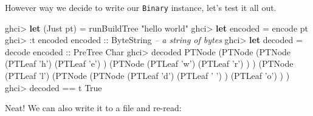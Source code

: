 \documentclass[]{article}
\newenvironment{Shaded}{}{}
\newcommand{\KeywordTok}[1]{\textcolor[rgb]{0.00,0.44,0.13}{\textbf{{#1}}}}
\newcommand{\DataTypeTok}[1]{\textcolor[rgb]{0.56,0.13,0.00}{{#1}}}
\newcommand{\CharTok}[1]{\textcolor[rgb]{0.25,0.44,0.63}{{#1}}}
\newcommand{\StringTok}[1]{\textcolor[rgb]{0.25,0.44,0.63}{{#1}}}
\newcommand{\CommentTok}[1]{\textcolor[rgb]{0.38,0.63,0.69}{\textit{{#1}}}}
\newcommand{\OtherTok}[1]{\textcolor[rgb]{0.00,0.44,0.13}{{#1}}}
\newcommand{\FunctionTok}[1]{\textcolor[rgb]{0.02,0.16,0.49}{{#1}}}
\newcommand{\NormalTok}[1]{{#1}}
\begin{document}
However way we decide to write our \texttt{Binary} instance, let's test
it all out.

\begin{Shaded}
\begin{Highlighting}[]
\NormalTok{ghci}\FunctionTok{>} \KeywordTok{let} \NormalTok{(}\DataTypeTok{Just} \NormalTok{pt) }\FunctionTok{=} \NormalTok{runBuildTree }\StringTok{"hello world"}
\NormalTok{ghci}\FunctionTok{>} \KeywordTok{let} \NormalTok{encoded }\FunctionTok{=} \NormalTok{encode pt}
\NormalTok{ghci}\FunctionTok{>} \FunctionTok{:}\NormalTok{t encoded}
\OtherTok{encoded ::} \DataTypeTok{ByteString}       \CommentTok{-- a string of bytes}
\NormalTok{ghci}\FunctionTok{>} \KeywordTok{let} \NormalTok{decoded }\FunctionTok{=} \NormalTok{decode}\OtherTok{ encoded ::} \DataTypeTok{PreTree} \DataTypeTok{Char}
\NormalTok{ghci}\FunctionTok{>} \NormalTok{decoded}
\DataTypeTok{PTNode} \NormalTok{(}\DataTypeTok{PTNode} \NormalTok{(}\DataTypeTok{PTNode} \NormalTok{(}\DataTypeTok{PTLeaf} \CharTok{'h'}\NormalTok{)}
                       \NormalTok{(}\DataTypeTok{PTLeaf} \CharTok{'e'}\NormalTok{)}
               \NormalTok{)}
               \NormalTok{(}\DataTypeTok{PTNode} \NormalTok{(}\DataTypeTok{PTLeaf} \CharTok{'w'}\NormalTok{)}
                       \NormalTok{(}\DataTypeTok{PTLeaf} \CharTok{'r'}\NormalTok{)}
               \NormalTok{)}
       \NormalTok{)}
       \NormalTok{(}\DataTypeTok{PTNode} \NormalTok{(}\DataTypeTok{PTLeaf} \CharTok{'l'}\NormalTok{)}
               \NormalTok{(}\DataTypeTok{PTNode} \NormalTok{(}\DataTypeTok{PTNode} \NormalTok{(}\DataTypeTok{PTLeaf} \CharTok{'d'}\NormalTok{)}
                               \NormalTok{(}\DataTypeTok{PTLeaf} \CharTok{' '}\NormalTok{)}
                       \NormalTok{)}
                       \NormalTok{(}\DataTypeTok{PTLeaf} \CharTok{'o'}\NormalTok{)}
               \NormalTok{)}
       \NormalTok{)}
\NormalTok{ghci}\FunctionTok{>} \NormalTok{decoded }\FunctionTok{==} \NormalTok{t}
\DataTypeTok{True}
\end{Highlighting}
\end{Shaded}

Neat! We can also write it to a file and re-read:
\end{document}
